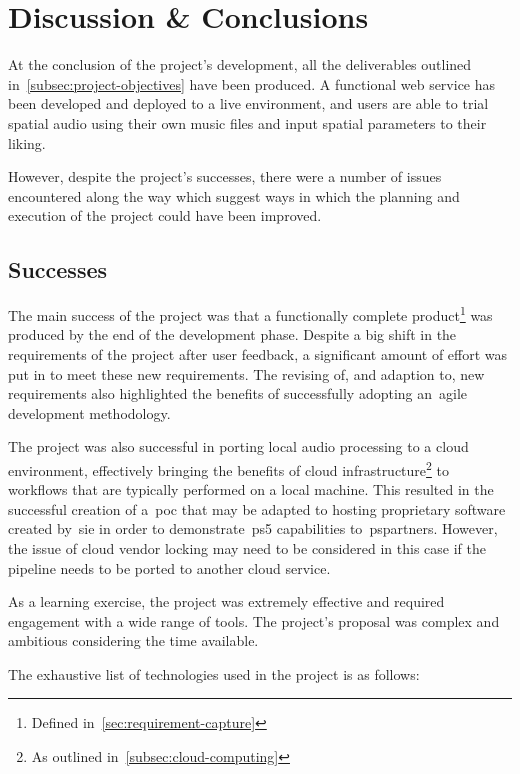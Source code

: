 \thispagestyle{plain}
\newpage
\section{Discussion \& Conclusions}\label{sec:discussion-conclusions}

\normalsize

At the conclusion of the project's development,
all the deliverables outlined in~\ref{subsec:project-objectives} have been produced.
A functional web service has been developed
and deployed to a live environment,
and users are able to trial spatial audio using their own music files and input spatial parameters to their liking.

However, despite the project's successes,
there were a number of issues encountered along the way
which suggest ways in which the planning and execution of the project could have been improved.

\subsection{Successes}\label{subsec:successes}

The main success of the project was that a functionally complete product\footnote{Defined in~\ref{sec:requirement-capture}} was produced by the end of the development phase.
Despite a big shift in the requirements of the project after user feedback,
a significant amount of effort was put in to meet these new requirements.
The revising of, and adaption to, new requirements also highlighted the benefits
of successfully adopting an~\gls{agile} development methodology.

The project was also successful in porting local audio processing to a cloud environment,
effectively bringing the benefits of cloud infrastructure\footnote{As outlined in~\ref{subsec:cloud-computing}} to workflows
that are typically performed on a local machine.
This resulted in the successful creation of a~\gls{poc} that
may be adapted
to hosting proprietary software created by~\gls{sie} in order to demonstrate~\gls{ps5} capabilities to~\glspl{pspartner}.
However,
the issue of cloud vendor locking may need to be considered in this case
if the pipeline needs to be ported to another cloud service.

As a learning exercise, the project was extremely effective and required engagement with a wide range of tools.
The project's proposal was complex and ambitious considering the time available.

The exhaustive list of technologies used in the project is as follows:

